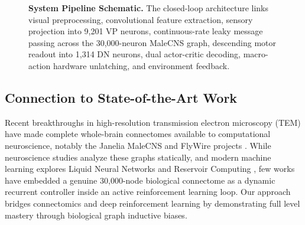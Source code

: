 \documentclass[10pt,twocolumn]{article}
\begin{document}
\begin{figure}[t]
\caption{\textbf{System Pipeline Schematic.} The closed-loop architecture links visual preprocessing, convolutional feature extraction, sensory projection into 9,201 VP neurons, continuous-rate leaky message passing across the 30,000-neuron MaleCNS graph, descending motor readout into 1,314 DN neurons, dual actor-critic decoding, macro-action hardware unlatching, and environment feedback.}
\label{fig:pipeline}
\end{figure}

\subsection{Connection to State-of-the-Art Work}
Recent breakthroughs in high-resolution transmission electron microscopy (TEM) have made complete whole-brain connectomes available to computational neuroscience, notably the Janelia MaleCNS and FlyWire projects \cite{dorkenwald2024neuronal, schlegel2024whole}. While neuroscience studies analyze these graphs statically, and modern machine learning explores Liquid Neural Networks \cite{hasani2021liquid} and Reservoir Computing \cite{jaeger2001echo}, few works have embedded a genuine 30,000-node biological connectome as a dynamic recurrent controller inside an active reinforcement learning loop. Our approach bridges connectomics and deep reinforcement learning by demonstrating full level mastery through biological graph inductive biases.
\end{document}
